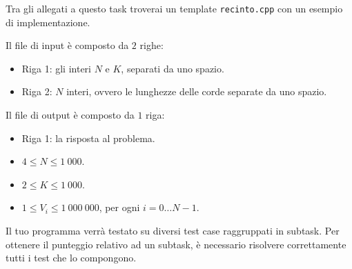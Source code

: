 \begin{warning}
    Tra gli allegati a questo task troverai un template \texttt{recinto.cpp} con un esempio di implementazione.
\end{warning}

Il file di input è composto da $2$ righe:
\begin{itemize}
    \item Riga 1: gli interi $N$ e $K$, separati da uno spazio.
    \item Riga 2: $N$ interi, ovvero le lunghezze delle corde separate da uno spazio.
\end{itemize}

Il file di output è composto da $1$ riga:
\begin{itemize}
    \item Riga 1: la risposta al problema.
\end{itemize}


\Constraints

\begin{itemize}[nolistsep, itemsep=2mm]
    \item $4 \le N \le 1\:000$.
    \item $2 \le K \le 1\:000$.
    \item $1 \le V_i \le 1\:000\:000$, per ogni $i = 0 \dots N-1$.
\end{itemize}


\Scoring

Il tuo programma verrà testato su diversi test case raggruppati in subtask.
Per ottenere il punteggio relativo ad un subtask,
è necessario risolvere correttamente tutti i test che lo compongono.








